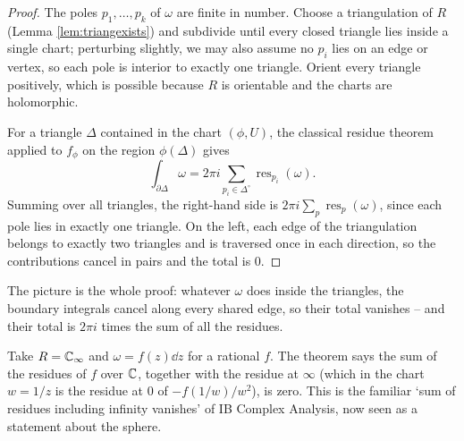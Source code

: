 \documentclass[a4paper]{scrartcl}
\newcommand{\Cinf}{\C_\infty}
\newcommand{\res}{\operatorname{res}}
\begin{document}
\begin{proof}
	The poles $p_1,\dots,p_k$ of $\omega$ are finite in number. Choose a triangulation of
	$R$ (Lemma \ref{lem:triangexists}) and subdivide until every closed triangle lies
	inside a single chart; perturbing slightly, we may also assume no $p_i$ lies on an edge
	or vertex, so each pole is interior to exactly one triangle. Orient every triangle
	positively, which is possible because $R$ is orientable and the charts are
	holomorphic.

	For a triangle $\Delta$ contained in the chart $(\phi, U)$, the classical residue
	theorem applied to $f_\phi$ on the region $\phi(\Delta)$ gives
	$$
	\int_{\partial\Delta}\omega = 2\pi i \sum_{p_i \in \Delta^\circ}\res_{p_i}(\omega).
	$$
	Summing over all triangles, the right-hand side is $2\pi i \sum_p \res_p(\omega)$,
	since each pole lies in exactly one triangle. On the left, each edge of the
	triangulation belongs to exactly two triangles and is traversed once in each direction,
	so the contributions cancel in pairs and the total is $0$.
\end{proof}

\begin{center}
\end{center}

The picture is the whole proof: whatever $\omega$ does inside the triangles, the boundary
integrals cancel along every shared edge, so their total vanishes -- and their total is
$2\pi i$ times the sum of all the residues.

\begin{example}
	Take $R = \Cinf$ and $\omega = f(z)\dd z$ for a rational $f$. The theorem says the sum
	of the residues of $f$ over $\mathbb{C}$, together with the residue at $\infty$ (which in the
	chart $w = 1/z$ is the residue at $0$ of $-f(1/w)/w^2$), is zero. This is the familiar
	`sum of residues including infinity vanishes' of IB Complex Analysis, now seen as a
	statement about the sphere.
\end{example}
\end{document}
